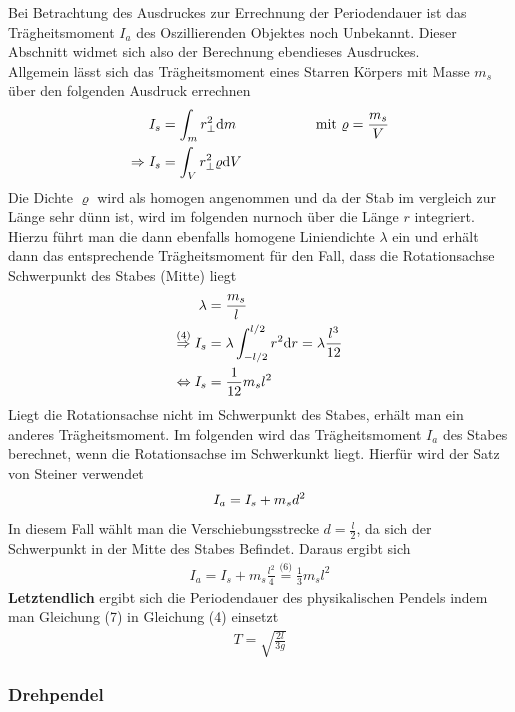 \documentclass[11pt,a4paper]{article}
\begin{document}
Bei Betrachtung des Ausdruckes zur Errechnung der Periodendauer ist das Trägheitsmoment $I_a$ des Oszillierenden Objektes noch Unbekannt. Dieser Abschnitt widmet sich also der Berechnung ebendieses Ausdruckes.\\

Allgemein lässt sich das Trägheitsmoment eines Starren Körpers mit Masse $m_s$ über den folgenden Ausdruck errechnen
\begin{align}
	I_s &= \int_{m}^{}  r^2_\perp \mathrm{d}m  \hspace{2cm}\text{mit  }  \varrho = \frac{m_s}{V} \notag\\
	\Rightarrow I_s &= \int_{V}^{} r^2_\perp \varrho \mathrm{d}V 
\end{align}
Die Dichte $\varrho$ wird als homogen angenommen und da der Stab im vergleich zur Länge sehr dünn ist, wird im folgenden nurnoch über die Länge $r$ integriert. Hierzu führt man die dann ebenfalls homogene Liniendichte $\lambda$ ein und erhält dann das entsprechende Trägheitsmoment für den Fall, dass die Rotationsachse Schwerpunkt des Stabes (Mitte) liegt
\begin{align}
	\lambda &= \frac{m_s}{l} \notag \\
	\overset{\text{(4)}}{\underset{\text{ }}{\Rightarrow}} I_s &= \lambda\int_{-l/2}^{l/2} r^2 \mathrm{d}r = \lambda \frac{l^3}{12}\notag \\
	\Leftrightarrow I_s &= \frac{1}{12} m_s l^2 
\end{align}
Liegt die Rotationsachse nicht im Schwerpunkt des Stabes, erhält man ein anderes Trägheitsmoment. Im folgenden wird das Trägheitsmoment $I_a$ des Stabes berechnet, wenn die Rotationsachse im Schwerkunkt liegt. Hierfür wird der Satz von Steiner verwendet
\begin{align}
	I_a = I_s + m_s d^2 \notag
\end{align}
	In diesem Fall wählt man die Verschiebungsstrecke $d=\frac{l}{2}$, da sich der Schwerpunkt in der Mitte des Stabes Befindet. Daraus ergibt sich
\begin{align}
	 I_a = I_s +m_s \frac{l^2}{4}  \overset{\text{(6)}}{=} \frac{1}{3} m_s l^2
\end{align}
{\bf Letztendlich} ergibt sich die Periodendauer des physikalischen Pendels indem man Gleichung (7) in Gleichung (4) einsetzt
\begin{align}
	T = \sqrt{\frac{2l}{3g}} 
\end{align}
       \subsubsection{Drehpendel}
\end{document}

